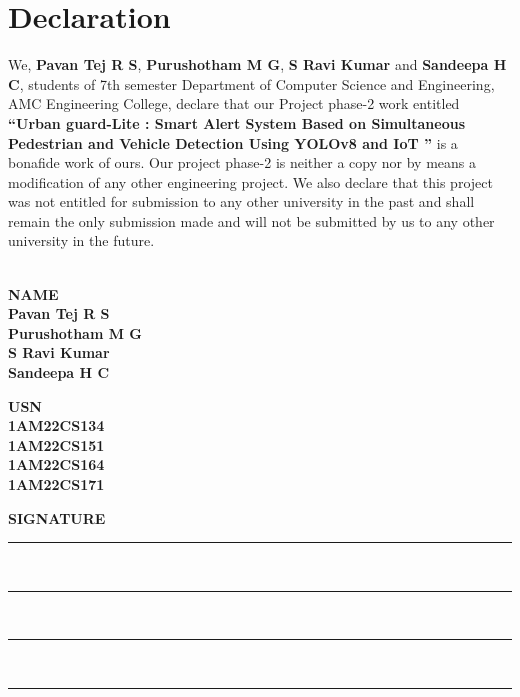 \documentclass[a4paper, 12pt]{report}
\begin{document}
\chapter*{Declaration}
\thispagestyle{borderedpage}
{}
We, \textbf{Pavan Tej R S}, \textbf{Purushotham M G}, \textbf{S Ravi Kumar} and \textbf{Sandeepa H C}, students of 7th semester Department of Computer Science and Engineering, AMC Engineering College, declare that our Project phase-2 work entitled \textbf{“Urban guard-Lite : Smart Alert System Based on Simultaneous Pedestrian and Vehicle Detection Using YOLOv8 and IoT ”} is a bonafide work of ours. Our  project phase-2 is neither a copy nor by means a modification of any other engineering project. We also declare that this project was not entitled for submission to any other university in the past and shall remain the only submission made and will not be submitted by us to any other university in the future.\\
\vspace{1cm}\\
\noindent
\begin{minipage}[t]{0.32\textwidth}
    \centering
    \textbf{NAME\\[0.2cm]Pavan Tej R S\\[0.2cm]Purushotham M G\\[0.2cm]S Ravi Kumar\\[0.2cm]Sandeepa H C}
\end{minipage}
\hfill
\begin{minipage}[t]{0.32\textwidth}
    \centering
    \textbf{USN\\[0.2cm]1AM22CS134\\[0.2cm]1AM22CS151\\[0.2cm]1AM22CS164\\[0.2cm]1AM22CS171}
\end{minipage}
\hfill
\begin{minipage}[t]{0.32\textwidth}
    \centering
    \textbf{SIGNATURE\\}
    \vspace{0.4cm}
    \rule{0.8\linewidth}{0.4pt}\\[0.2cm]
    \rule{0.8\linewidth}{0.4pt}\\[0.2cm]
    \rule{0.8\linewidth}{0.4pt}\\[0.2cm]
    \rule{0.8\linewidth}{0.4pt}\\[0.2cm]
\end{minipage}\\
\end{document}
